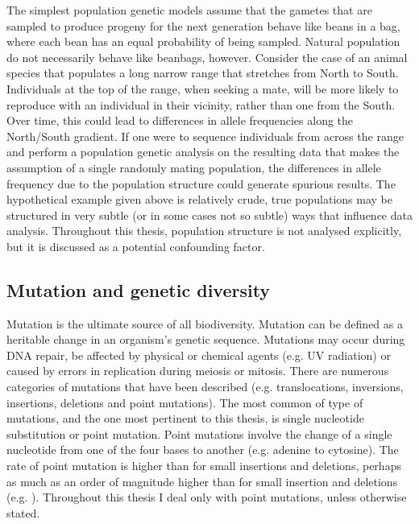 	The simplest population genetic models assume that the gametes that are sampled to produce progeny for the next generation behave like beans in a bag, where each bean has an equal probability of being sampled. Natural population do not necessarily behave like beanbags, however. Consider the case of an animal species that populates a long narrow range that stretches from North to South. Individuals at the top of the range, when seeking a mate, will be more likely to reproduce with an individual in their vicinity, rather than one from the South. Over time, this could lead to differences in allele frequencies along the North/South gradient. If one were to sequence individuals from across the range and perform a population genetic analysis on the resulting data that makes the assumption of a single randomly mating population, the differences in allele frequency due to the population structure could generate spurious results. The hypothetical example given above is relatively crude, true populations may be structured in very subtle (or in some cases not so subtle) ways that influence data analysis. Throughout this thesis, population structure is not analysed explicitly, but it is discussed as a potential confounding factor.

\subsection{Mutation and genetic diversity}

	Mutation is the ultimate source of all biodiversity. Mutation can be defined as a heritable change in an organism's genetic sequence. Mutations may occur during DNA repair, be affected by physical or chemical agents (e.g. UV radiation) or caused by errors in replication during meiosis or mitosis. There are numerous categories of mutations that have been described (e.g. translocations, inversions, insertions, deletions and point mutations). The most common of type of mutations, and the one most pertinent to this thesis, is single nucleotide substitution or point mutation. Point mutations involve the change of a single nucleotide from one of the four bases to another (e.g. adenine to cytosine). The rate of point mutation is higher than for small insertions and deletions, perhaps as much as an order of magnitude higher than for small insertion and deletions (e.g. \citealt{RN387}). Throughout this thesis I deal only with point mutations, unless otherwise stated.


